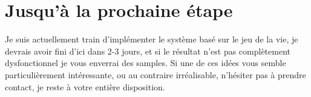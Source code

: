 \documentclass{article}
\begin{document}
  \section{Jusqu'à la prochaine étape} %
  \label{sec:Jusqu'à la prochaine étapes}
    Je suis actuellement train d'implémenter le système basé sur le jeu de la vie,
    je devrais avoir fini d'ici dans 2-3 jours, et si le résultat n'est pas
    complètement dysfonctionnel je vous enverrai des samples. Si une de ces idées
    vous semble particulièrement intéressante, ou au contraire irréalisable,
    n'hésiter pas à prendre contact, je reste à votre entière disposition.
\end{document}
